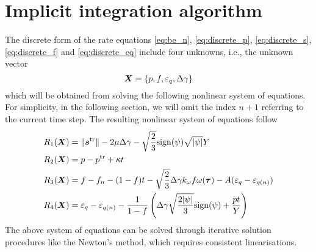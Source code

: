 \section{Implicit integration algorithm}
The discrete form of the rate equations \eqref{eq:be_n}, \eqref{eq:discrete_p}, \eqref{eq:discrete_s}, \eqref{eq:discrete_f} and \eqref{eq:discrete_eq} include four unknowns, i.e., the unknown vector
\begin{equation}\label{eq:X}
{\boldsymbol{X}}=\lbrace p, f, \varepsilon_q, \Delta\gamma \rbrace
\end{equation}
which will be obtained from solving the following nonlinear system of equations. For simplicity, in the following section, we will omit the index $n+1$ referring to the current time step. The resulting nonlinear system of equations follow
\begin{align}
R_1({\boldsymbol{X}}) &= \|{\boldsymbol{s}}^{\operatorname{\text{tr}}}\| - 2\mu\Delta\gamma - \sqrt{\frac{2}{3}}{\rm sign}(\psi)\sqrt{|\psi|}Y\label{eq:R1}\\
R_2({\boldsymbol{X}}) &= p - p^{\operatorname{\text{tr}}} + \kappa t\\
R_3({\boldsymbol{X}}) &= f - f_n - (1-f) t - \sqrt{\frac{2}{3}}\Delta\gamma k_{\omega}f \omega({\boldsymbol{\tau}}) - A(\varepsilon_{q} - \varepsilon_{q(n)}) \\
R_4({\boldsymbol{X}}) &=\varepsilon_q - \varepsilon_{q(n)}- \frac{1}{1-f}\left(\Delta\gamma\sqrt{\frac{2|\psi|}{3}} {\rm sign}(\psi) + \frac{p t}{Y}\right)\label{eq:R4}
\end{align}
The above system of equations can be solved through iterative solution procedures like the Newton's method, which requires consistent linearisations.

